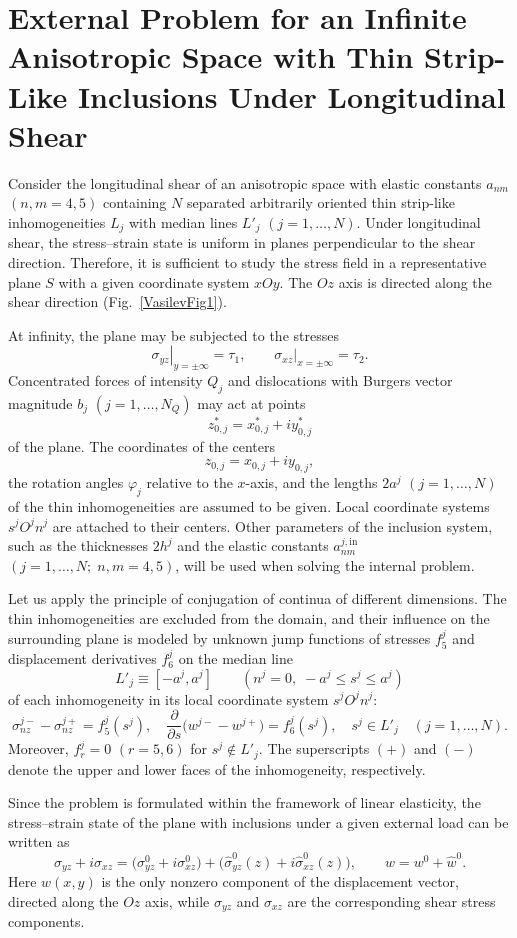 \section{External Problem for an Infinite Anisotropic Space with Thin Strip-Like Inclusions Under Longitudinal Shear}

Consider the longitudinal shear of an anisotropic space with elastic constants $a_{nm}$ $(n,m=4,5)$ containing $N$ separated arbitrarily oriented thin strip-like inhomogeneities $L_j$ with median lines $L'_j$ $(j=1,\ldots,N)$. Under longitudinal shear, the stress--strain state is uniform in planes perpendicular to the shear direction. Therefore, it is sufficient to study the stress field in a representative plane $S$ with a given coordinate system $xOy$. The $Oz$ axis is directed along the shear direction (Fig.~\ref{VasilevFig1}).

At infinity, the plane may be subjected to the stresses
\[
\left.\sigma_{yz}\right|_{y=\pm\infty}=\tau_1,
\qquad
\left.\sigma_{xz}\right|_{x=\pm\infty}=\tau_2.
\]
Concentrated forces of intensity $Q_j$ and dislocations with Burgers vector magnitude $b_j$ $(j=1,\ldots,N_Q)$ may act at points
\[
z_{0,j}^{*}=x_{0,j}^{*}+iy_{0,j}^{*}
\]
of the plane. The coordinates of the centers
\[
z_{0,j}=x_{0,j}+iy_{0,j},
\]
the rotation angles $\varphi_j$ relative to the $x$-axis, and the lengths $2a^j$ $(j=1,\ldots,N)$ of the thin inhomogeneities are assumed to be given. Local coordinate systems $s^jO^jn^j$ are attached to their centers. Other parameters of the inclusion system, such as the thicknesses $2h^j$ and the elastic constants $a_{nm}^{j,\mathrm{in}}$ $(j=1,\ldots,N;\; n,m=4,5)$, will be used when solving the internal problem.

Let us apply the principle of conjugation of continua of different dimensions. The thin inhomogeneities are excluded from the domain, and their influence on the surrounding plane is modeled by unknown jump functions of stresses $f_5^j$ and displacement derivatives $f_6^j$ on the median line
\[
L'_j\equiv[-a^j,a^j]
\qquad
(n^j=0,\; -a^j\le s^j\le a^j)
\]
of each inhomogeneity in its local coordinate system $s^jO^jn^j$:
\[
\sigma_{nz}^{j-}-\sigma_{nz}^{j+}=f_5^j(s^j),
\quad
\frac{\partial}{\partial s}\bigl(w^{j-}-w^{j+}\bigr)=f_6^j(s^j),
\quad
s^j\in L'_j
\quad (j=1,\ldots,N).
\]
Moreover, $f_r^j=0$ $(r=5,6)$ for $s^j\notin L'_j$. The superscripts $(+)$ and $(-)$ denote the upper and lower faces of the inhomogeneity, respectively.

Since the problem is formulated within the framework of linear elasticity, the stress--strain state of the plane with inclusions under a given external load can be written as
\begin{equation}
	\sigma_{yz}+i\sigma_{xz}
	=
	\bigl(\sigma_{yz}^{0}+i\sigma_{xz}^{0}\bigr)
	+
	\bigl(\widehat{\sigma}_{yz}^{0}(z)+i\widehat{\sigma}_{xz}^{0}(z)\bigr),
	\qquad
	w=w^{0}+\widehat{w}^{0}.
	\label{VasilevEq1}
\end{equation}
Here $w(x,y)$ is the only nonzero component of the displacement vector, directed along the $Oz$ axis, while $\sigma_{yz}$ and $\sigma_{xz}$ are the corresponding shear stress components.

